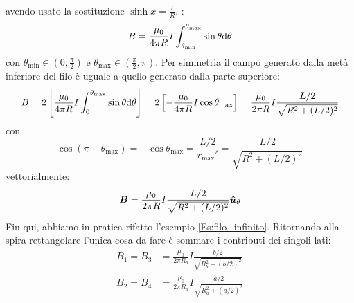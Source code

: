 \begin{Es}
{\[    \]
    avendo usato la sostituzione $\sinh x=\frac{l}{R}$.
  }:
  \[
    B = \frac{\mu_0}{4\pi R}I\int_{\theta_\text{min}}^{\theta_\text{max}}\sin\theta\mathrm{d}\theta
  \]
  con $\theta_\text{min}\in (0,\frac{\pi}{2})$ e $\theta_\text{max}\in (\frac{\pi}{2},\pi)$. Per simmetria il campo generato dalla metà inferiore del filo è uguale a quello generato dalla parte superiore:
  \[
    B = 2\left[\frac{\mu_0}{4\pi R}I\int_{0}^{\theta_\text{max}}\sin\theta\mathrm{d}\theta\right]= 2\left[-\frac{\mu_0}{4\pi R}I\cos\theta_\text{max}\right]=\frac{\mu_0}{2\pi R}I\frac{L/2}{\sqrt{R^2+(L/2)^2}}
  \]
  con
  \[
    \cos(\pi-\theta_\text{max})=-\cos\theta_\text{max} = \frac{L/2}{r_\text{max}'}=\frac{L/2}{\sqrt{R^2+(L/2)^2}}
  \]
  vettorialmente:
  \[
    \boldsymbol{B} = \frac{\mu_0}{2\pi R}I\frac{L/2}{\sqrt{R^2+(L/2)^2}}\boldsymbol{\hat {u}}_\theta
  \]
  Fin qui, abbiamo in pratica rifatto l'esempio \ref{Es:filo_infinito}. Ritornando alla spira rettangolare l'unica cosa da fare è sommare i contributi dei singoli lati:
  \begin{align*}
    B_1 = B_3 & = \frac{\mu_0}{2\pi R_b}I\frac{b/2}{\sqrt{R_b^2+(b/2)^2}} \\
    B_2 = B_4 & = \frac{\mu_0}{2\pi R_a}I\frac{a/2}{\sqrt{R_a^2+(a/2)^2}} \\
  \end{align*}
  \begin{figure}[htbp]
    \centering

\end{figure}
\end{Es}
